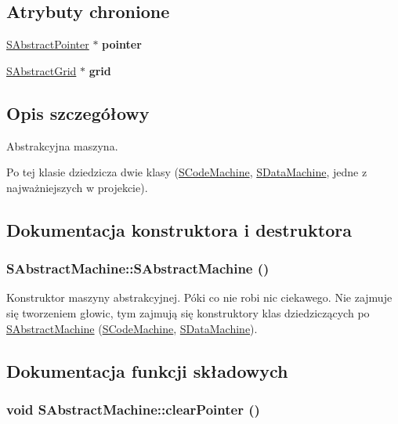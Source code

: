 \subsection*{Atrybuty chronione}
\begin{CompactItemize}
\item 
\hypertarget{classSAbstractMachine_7fb67b2cf326fa3176570ca65c573c79}{
\hyperlink{classSAbstractPointer}{SAbstractPointer} $\ast$ \textbf{pointer}}
\label{classSAbstractMachine_7fb67b2cf326fa3176570ca65c573c79}

\item 
\hypertarget{classSAbstractMachine_08b7046c29a7a5f248f324edee91f2dc}{
\hyperlink{classSAbstractGrid}{SAbstractGrid} $\ast$ \textbf{grid}}
\label{classSAbstractMachine_08b7046c29a7a5f248f324edee91f2dc}

\end{CompactItemize}


\subsection{Opis szczegółowy}
Abstrakcyjna maszyna. 

Po tej klasie dziedzicza dwie klasy (\hyperlink{classSCodeMachine}{SCodeMachine}, \hyperlink{classSDataMachine}{SDataMachine}, jedne z najważniejszych w projekcie). 

\subsection{Dokumentacja konstruktora i destruktora}
\hypertarget{classSAbstractMachine_f0ffb270de2ea44e89123a873bc5660a}{
\subsubsection[{SAbstractMachine}]{\setlength{\rightskip}{0pt plus 5cm}SAbstractMachine::SAbstractMachine ()}}
\label{classSAbstractMachine_f0ffb270de2ea44e89123a873bc5660a}


Konstruktor maszyny abstrakcyjnej. Póki co nie robi nic ciekawego. Nie zajmuje się tworzeniem głowic, tym zajmują się konstruktory klas dziedziczących po \hyperlink{classSAbstractMachine}{SAbstractMachine} (\hyperlink{classSCodeMachine}{SCodeMachine}, \hyperlink{classSDataMachine}{SDataMachine}). 

\subsection{Dokumentacja funkcji składowych}
\hypertarget{classSAbstractMachine_87766a003773869a3438e92739d7c9a1}{
\subsubsection[{clearPointer}]{\setlength{\rightskip}{0pt plus 5cm}void SAbstractMachine::clearPointer ()}}
\label{classSAbstractMachine_87766a003773869a3438e92739d7c9a1}


